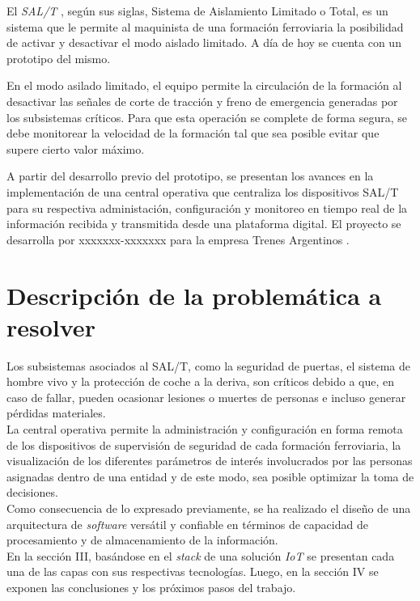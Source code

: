 \documentclass[a4paper]{IEEEtran}
\begin{document}
El \textit{SAL/T} \cite{b1}, según sus siglas, Sistema de Aislamiento Limitado o Total, es un sistema que le permite al maquinista de una formación ferroviaria la posibilidad de activar y desactivar el modo aislado limitado. A día de hoy se cuenta con un prototipo del mismo.

En el modo asilado limitado, el equipo permite la circulación de la formación al desactivar las señales de corte de tracción y freno de emergencia generadas por los subsistemas críticos. Para que esta operación se complete de forma segura, se debe monitorear la velocidad de la formación tal que sea posible evitar que supere cierto valor máximo.

A partir del desarrollo previo del prototipo, se presentan los avances en la implementación de una central operativa que centraliza los dispositivos SAL/T para su respectiva administación, configuración y monitoreo en tiempo real de la información recibida y transmitida desde una plataforma digital. El proyecto se desarrolla por xxxxxxx-xxxxxxx \cite{b2} para la empresa Trenes Argentinos \cite{b3}. 

\section{Descripción de la problemática a resolver}

Los subsistemas asociados al SAL/T, como la seguridad de puertas, el sistema de hombre vivo y la protección de coche a la deriva, son críticos debido a que, en caso de fallar, pueden ocasionar lesiones o muertes de personas e incluso generar pérdidas materiales. \\ 

La central operativa permite la administración y configuración en forma remota de los dispositivos de supervisión de seguridad de cada formación ferroviaria, la visualización de los diferentes parámetros de interés involucrados por las personas asignadas dentro de una entidad y de este modo, sea posible optimizar la toma de decisiones. \\

Como consecuencia de lo expresado previamente, se ha realizado el diseño de una arquitectura de \textit{software} versátil y confiable en términos de capacidad de procesamiento y de almacenamiento de la información. \\

En la sección III, basándose en el \textit{stack} de una solución \textit{IoT} \cite{b4} se presentan cada una de las capas con sus respectivas tecnologías. Luego, en la sección IV se exponen las conclusiones y los próximos pasos del trabajo.
\end{document}
